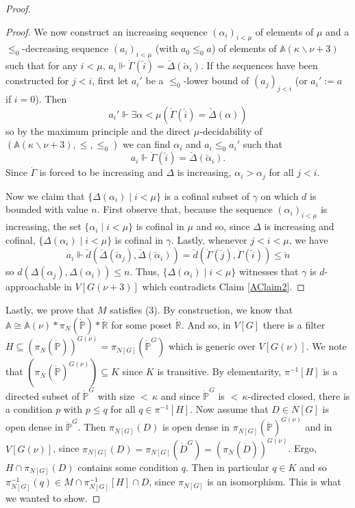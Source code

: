 \documentclass[a4paper]{amsart}
\theoremstyle{definition}
\theoremstyle{remark}
\theoremstyle{plain}
\numberwithin{mydef}{section}
\newcommand{\dA}{\mathbb{A}}
\newcommand{\dP}{\mathbb{P}}
\newcommand{\dR}{\mathbb{R}}
\begin{document}
\begin{proof}
\begin{proof}
			We now construct an increasing sequence $(\alpha_i)_{i<\mu}$ of elements of $\mu$ and a $\leq_0$-decreasing sequence $(a_i)_{i<\mu}$ (with $a_0\leq_0 a$) of elements of $\dA(\kappa\smallsetminus\nu+3)$ such that for any $i<\mu$, $a_i\Vdash\dot{\Gamma}(\check{i})=\check{\Delta}(\check{\alpha}_i)$. If the sequences have been constructed for $j<i$, first let $a_i'$ be a $\leq_0$-lower bound of $(a_j)_{j<i}$ (or $a_i':=a$ if $i=0$). Then
			$$a_i'\Vdash\exists\alpha<\mu(\dot{\Gamma}(\check{i})=\check{\Delta}(\alpha))$$
			so by the maximum principle and the direct $\mu$-decidability of $(\dA(\kappa\smallsetminus\nu+3),\leq,\leq_0)$ we can find $\alpha_i$ and $a_i\leq_0a_i'$ such that
			$$a_i\Vdash\dot{\Gamma}(\check{i})=\check{\Delta}(\check{\alpha}_i).$$
			Since $\dot{\Gamma}$ is forced to be increasing and $\Delta$ is increasing, $\alpha_i>\alpha_j$ for all $j<i$.
			
			Now we claim that $\{\Delta(\alpha_i)\;|\;i<\mu\}$ is a cofinal subset of $\gamma$ on which $d$ is bounded with value $n$. First observe that, because the sequence $(\alpha_i)_{i<\mu}$ is increasing, the set $\{\alpha_i\;|\;i<\mu\}$ is cofinal in $\mu$ and so, since $\Delta$ is increasing and cofinal, $\{\Delta(\alpha_i)\;|\;i<\mu\}$ is cofinal in $\gamma$. Lastly, whenever $j<i<\mu$, we have
			$$a_i\Vdash\check{d}(\check{\Delta}(\check{\alpha}_j),\check{\Delta}(\check{\alpha}_i))=\check{d}(\dot{\Gamma}(\check{j}),\dot{\Gamma}(\check{i}))\leq\check{n}$$
			so $d(\Delta(\alpha_j),\Delta(\alpha_i))\leq n$. Thus, $\{\Delta(\alpha_i)\;|\;i<\mu\}$ witnesses that $\gamma$ is $d$-approachable in $V[G(\nu+3)]$ which contradicts Claim \ref{AClaim2}.
		\end{proof}
		
		Lastly, we prove that $M$ satisfies (3). By construction, we know that $\dA\cong\dA(\nu)*\pi_N(\dot{\dP})*\dot{\dR}$ for some poset $\dot{\dR}$. And so, in $V[G]$ there is a filter $H\subseteq(\pi_N(\dot{\dP}))^{G(\nu)}=\pi_{N[G]}(\dot{\dP}^G)$ which is generic over $V[G(\nu)]$. We note that $(\pi_N(\dot{\dP})^{G(\nu)})\subseteq K$ since $K$ is transitive. By elementarity, $\pi^{-1}[H]$ is a directed subset of $\dot{\dP}^G$ with size ${<}\,\kappa$ and since $\dot{\dP}^G$ is ${<}\,\kappa$-directed closed, there is a condition $p$ with $p\leq q$ for all $q\in\pi^{-1}[H]$. Now assume that $D\in N[G]$ is open dense in $\dot{\dP}^G$. Then $\pi_{N[G]}(D)$ is open dense in $\pi_{N[G]}(\dot{\dP})^{G(\nu)}$ and in $V[G(\nu)]$, since $\pi_{N[G]}(D)=\pi_{N[G]}(\dot{D}^G)=(\pi_N(\dot{D}))^{G(\nu)}$. Ergo, $H\cap\pi_{N[G]}(D)$ contains some condition $q$. Then in particular $q\in K$ and so $\pi_{N[G]}^{-1}(q)\in M\cap \pi_{N[G]}^{-1}[H]\cap D$, since $\pi_{N[G]}$ is an isomorphism. This is what we wanted to show.
	\end{proof}
	
\end{document}
